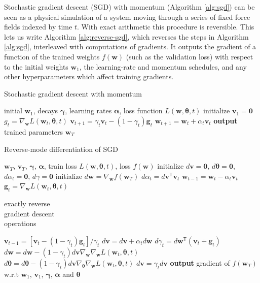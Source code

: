 \documentclass{article}
\newcommand{\vw}{\mathbf{w}}
\newcommand{\vv}{\mathbf{v}}
\newcommand{\vg}{\mathbf{g}}
\newcommand{\vzero}{\mathbf{0}}
\newcommand{\tra}{^{\mathsf{T}}}
\newcommand{\hypers}{{\boldsymbol{\theta}}}
\newcommand{\params}{\vw}
\newcommand{\decay}{\gamma}
\newcommand{\decays}{{\boldsymbol{\decay}}}
\newcommand{\stepsize}{\alpha}
\newcommand{\stepsizes}{{\boldsymbol{\stepsize}}}
\newcommand{\gradparams}{\nabla_\params L(\params_t, \hypers, t)}
\begin{document}
Stochastic gradient descent (SGD) with momentum (Algorithm \ref{alg:sgd}) can be
seen as a physical simulation of a system moving through a series of fixed force
fields indexed by time $t$. With exact arithmetic this procedure is reversible. This lets us write Algorithm \ref{alg:reverse-sgd}, which reverses the steps in Algorithm
\ref{alg:sgd}, interleaved with computations of gradients. It outputs the
gradient of a function of the trained weights $f(\params)$ (such as the validation
loss) with respect to the initial weights $\params_1$, the learning-rate and momentum
schedules, and any other hyperparameters which affect training gradients.

\begin{algorithm}
   \caption{Stochastic gradient descent with momentum}
   \label{alg:sgd}
\begin{algorithmic}[1]
    initial $\params_1$, decays $\decays$, learning rates $\stepsizes$, loss function $L(\params, \hypers, t)$
   \State initialize $\vv_1 = \vzero$
   \State $g_t = \gradparams$ 
   \State $\vv_{t+1} = \decay_t \vv_t - (1 - \decay_t) \vg_t$   \label{step:update velocity}
   \State $\params_{t+1} = \params_t + \stepsize_t \vv_t$  \label{step:update position}
   \EndFor
   \State \textbf{output} trained parameters $\params_T$
\end{algorithmic}
\end{algorithm}
%
\begin{algorithm}
   \caption{Reverse-mode differentiation of SGD}
   \label{alg:reverse-sgd}
\begin{algorithmic}[1]
    $\params_T$, $\vv_T$, $\decays$, $\stepsizes$, train loss $L(\params, \hypers, t)$, loss $f(\params)$
   \State initialize $d\vv = \vzero$, $d\hypers = \vzero$, $d\stepsize_t = \vzero$, $d\decay = \vzero$
   \State initialize $d\params = \nabla_\params f(\params_T)$
   \State $d\stepsize_t = d\vv\tra \vv_t$
   \State $\params_{t-1} = \params_t - \stepsize_t \vv_t$ \label{step:reverse-position}
   \vspace{-0.95\baselineskip}
   \State $\vg_t = \gradparams$ \label{step:reverse-gradient}
   \hfill \scalebox{1.1}{\Bigg\}} \vspace{-\baselineskip} \begin{minipage}{2.5cm} exactly reverse \\ gradient descent \\ operations \strut \end{minipage}
   \State $\vv_{t-1} = [\vv_t - (1 - \decay_t) \vg_t] / \decay_t$ \label{step:reverse-velocity}
   \State $d\vv = d\vv + \stepsize_t d\params$
   \State $d\decay_t = d\params\tra (\vv_t + \vg_t)$
   \State $d\params = d\params - (1 - \decay_t) d\vv \nabla_\params \gradparams$ \label{line:hvp1}
   \State $d\hypers = d\hypers - (1 - \decay_t) d\vv \nabla_\hypers \gradparams$ \label{line:hvp2}
   \State $d\vv = \decay_t d\vv$
   \EndFor
   \State \textbf{output} gradient of $f(\params_T)$ w.r.t $\params_1$, $\vv_1$, $\decays$, $\stepsizes$ and $\hypers$
\end{algorithmic}
\end{algorithm}
\end{document}
